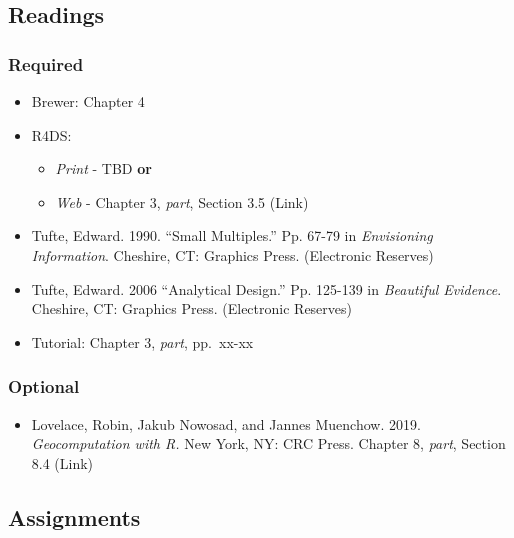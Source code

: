 \documentclass[]{book}
\providecommand{\tightlist}{%
  \setlength{\itemsep}{0pt}\setlength{\parskip}{0pt}}
\begin{document}
\hypertarget{readings-7}{%
\subsection*{Readings}\label{readings-7}}

\hypertarget{required-4}{%
\subsubsection*{Required}\label{required-4}}

\begin{itemize}
\tightlist
\item
  Brewer: Chapter 4
\item
  R4DS:

  \begin{itemize}
  \tightlist
  \item
    \emph{Print} - TBD \textbf{or}
  \item
    \emph{Web} - Chapter 3, \emph{part}, Section 3.5 (Link)
  \end{itemize}
\item
  Tufte, Edward. 1990. ``Small Multiples.'' Pp. 67-79 in \emph{Envisioning Information}. Cheshire, CT: Graphics Press. (Electronic Reserves)
\item
  Tufte, Edward. 2006 ``Analytical Design.'' Pp. 125-139 in \emph{Beautiful Evidence}. Cheshire, CT: Graphics Press. (Electronic Reserves)
\item
  Tutorial: Chapter 3, \emph{part}, pp.~xx-xx
\end{itemize}

\hypertarget{optional-3}{%
\subsubsection*{Optional}\label{optional-3}}

\begin{itemize}
\tightlist
\item
  Lovelace, Robin, Jakub Nowosad, and Jannes Muenchow. 2019. \emph{Geocomputation with R.} New York, NY: CRC Press. Chapter 8, \emph{part}, Section 8.4 (Link)
\end{itemize}

\hypertarget{assignments-7}{%
\subsection*{Assignments}\label{assignments-7}}
\end{document}
